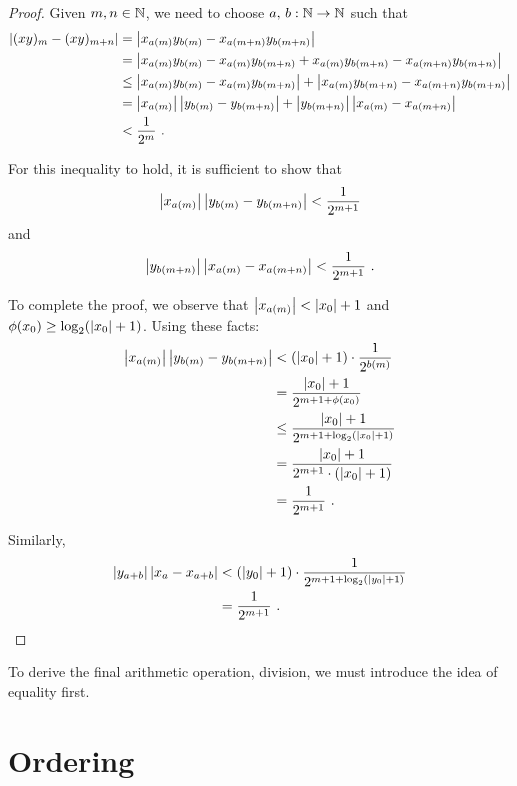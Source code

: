 \documentclass[leqno]{report}
\begin{document}
\begin{proof}
    Given $m, n \in \mathbb{N}$, we need to choose $a,\, b : \mathbb{N} \rightarrow \mathbb{N}$ such that
    \begin{align*}
        \left| (xy)_m - (xy)_{m+n} \right|
        &= \left| x_{a(m)} y_{b(m)} - x_{a(m+n)} y_{b(m+n)} \right| \\
        &= \left| x_{a(m)} y_{b(m)} - x_{a(m)} y_{b(m+n)} + x_{a(m)} y_{b(m+n)} - x_{a(m+n)} y_{b(m+n)} \right| \\
        &\leq \left| x_{a(m)} y_{b(m)} - x_{a(m)} y_{b(m+n)} \right| + \left| x_{a(m)} y_{b(m+n)} - x_{a(m+n)} y_{b(m+n)} \right| \\
        &= \left| x_{a(m)} \right|\left| y_{b(m)} - y_{b(m+n)} \right| + \left| y_{b(m+n)} \right|\left| x_{a(m)} - x_{a(m+n)} \right| \\
        &< \frac{1}{2^m}
        \ .
    \end{align*}

    For this inequality to hold, it is sufficient to show that
    \[ \left| x_{a(m)} \right|\left| y_{b(m)} - y_{b(m+n)} \right| < \frac{1}{2^{m+1}} \]
    and
    \[ \left| y_{b(m+n)} \right|\left| x_{a(m)} - x_{a(m+n)} \right| < \frac{1}{2^{m+1}} \ . \]

    To complete the proof, we observe that $\left| x_{a(m)} \right| < \left| x_0 \right| + 1$ and $\phi(x_0) \geq \log_2(\left| x_0 \right| + 1)$. Using these facts:
    \begin{align*}
        \left| x_{a(m)} \right|\left| y_{b(m)} - y_{b(m+n)} \right|
        &< (\left| x_0 \right| + 1) \cdot \frac{1}{2^{b(m)}} \\
        &= \frac{\left| x_0 \right| + 1}{2^{m + 1 + \phi(x_0)}} \\
        &\leq \frac{\left| x_0 \right| + 1}{2^{m + 1 + \log_2(\left| x_0 \right| + 1)}} \\
        &= \frac{\left| x_0 \right| + 1}{2^{m + 1} \cdot (\left| x_0 \right| + 1)} \\
        &= \frac{1}{2^{m + 1}}
        \ .
    \end{align*}

    Similarly,
    \begin{align*}
        \left| y_{a+b} \right|\left| x_a - x_{a+b} \right|
        &< (\left| y_0 \right| + 1) \cdot \frac{1}{2^{m + 1 + \log_2(\left| y_0 \right| + 1)}} \\
        &= \frac{1}{2^{m + 1}}
        \ . \qedhere
    \end{align*}
\end{proof}

To derive the final arithmetic operation, division, we must introduce the idea of equality first.

\section{Ordering}
\end{document}
